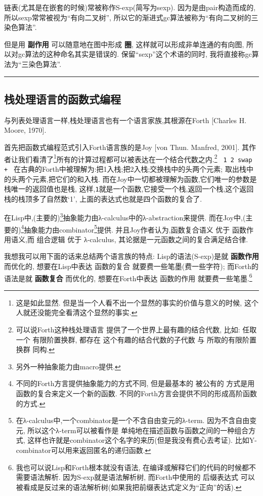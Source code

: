 \documentclass[a4paper]{article}
\begin{document}
链表(尤其是在嵌套的时候)常被称作S-exp(简写为sexp).
因为是由pair构造而成的,所以sexp常常被视为``有向二叉树'',
所以它的渐进式gc算法被称为``有向二叉树的三染色算法''.

但是用 \textbf{副作用} 可以随意地在图中形成 \textbf{圈},
这样就可以形成非单连通的有向图,
所以对gc算法的这种命名其实是错误的.
保留``sexp''这个术语的同时,
我将直接称gc算法为``三染色算法''.

\vspace{.5cm}\hrule\vspace{.5cm}


\subsection{栈处理语言的函数式编程}

与列表处理语言一样,栈处理语言也有一个语言家族,其根源在Forth [Charles H. Moore, 1970].

首先把函数式编程范式引入Forth语言族的是Joy [von Thun. Manfred, 2001].
其作者让我们看清了\footnote{这是如此显然.
但是当一个人看不出一个显然的事实的价值与意义的时候,
这个人就还没能完全看清这个显然的事实.}所有的计算过程都可以被表达在一个结合代数之内.\footnote{可以说Forth这种栈处理语言 提供了一个世界上最有趣的结合代数,
比如: 任取一个 有限阶置换群,
都存在 这个有趣的结合代数的子代数 与 所取的有限阶置换群 同构.}
\texttt{\
1 2 swap +\
}
在古典的Forth中被理解为:把1入栈;把2入栈;交换栈中的头两个元素;
取出栈中的头两个元素,把它们的和入栈.
而在Joy中一切都被理解为函数,它们唯一的参数是栈唯一的返回值也是栈,
这样,\texttt{1}就是一个函数,它接受一个栈,返回一个栈,这个返回栈的栈顶多了自然数`1',
上面的表达式也就是四个函数的复合了.

在Lisp中,(主要的)\footnote{另外一种抽象能力由macro提供.}抽象能力由λ-calculus中的λ-abstraction来提供.
而在Joy中,(主要的)\footnote{不同的Forth方言提供抽象能力的方式不同,
但是最基本的 被公有的 方式是用函数的复合来定义一个新的函数.
不同的Forth方言会提供不同的形成高阶函数的方式.}抽象能力由combinator\footnote{在λ-calculus中,一个combinator是一个不含自由变元的λ-term.
因为不含自由变元,
所以这个λ-term可以被看作是 单纯地在描述函数与函数之间的一种组合方式,
这样也许就是combinator这个名字的来历(但是我没有费心去考证).
比如Y-combinator可以用来返回匿名的递归函数.}提供.
并且Joy作者认为,函数复合语义 优于 函数作用语义,而 组合逻辑 优于 λ-calculus,
其论据是一元函数之间的复合满足结合律.

我想我可以用下面的话来总结两个语言族的特点:
Lisp的语法(S-exp)是就 \textbf{函数作用} 而优化的,
想要在Lisp中表达 函数的复合 就要费一些笔墨(费一些字符);
而Forth的语法是就 \textbf{函数复合} 而优化的,
想要在Forth中表达 函数的作用 就要费一些笔墨.\footnote{我也可以说Lisp和Forth根本就没有语法,
在编译或解释它们的代码的时候都不需要语法解析.
因为S-exp就是语法解析树,
而Forth中使用的 后缀表达式 可以被看成是反过来的语法解析树(如果我把前缀表达式定义为``正向''的话).}
\end{document}
